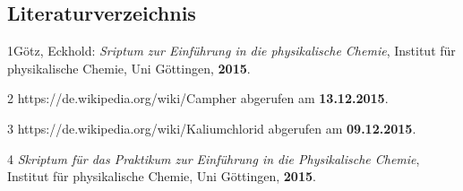 \documentclass[12pt,a4paper,titlepage,headinclude,bibtotoc]{scrartcl}
\begin{document}
\newpage



\subsection{Literaturverzeichnis}
1\quad Götz, Eckhold: \emph{Sriptum zur Einführung in die physikalische Chemie}, Institut für physikalische Chemie, Uni Göttingen, \textbf{2015}.

\vspace{0,5 cm}

2 \quad https://de.wikipedia.org/wiki/Campher abgerufen am \textbf{13.12.2015}.

\vspace{0,5cm}

3 \quad https://de.wikipedia.org/wiki/Kaliumchlorid abgerufen am \textbf{09.12.2015}.

\vspace{0,5cm}

4 \quad \emph{Skriptum für das Praktikum zur Einführung in die Physikalische Chemie}, Institut für physikalische Chemie, Uni Göttingen, \textbf{2015}.\\
\end{document}
